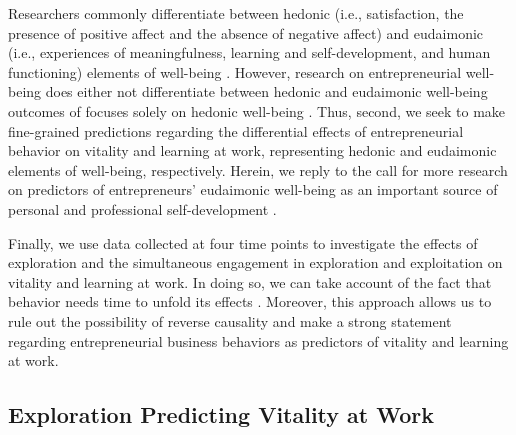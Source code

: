 \documentclass[man, 12pt, a4paper, noextraspace]{apa6}
\begin{document}
Researchers commonly differentiate between hedonic (i.e., satisfaction, the presence of positive affect and the absence of negative aﬀect) and eudaimonic (i.e., experiences of meaningfulness, learning and self-development, and human functioning) elements of well-being \parencite{Ryan.2001}. 
However, research on entrepreneurial well-being does either not differentiate between hedonic and eudaimonic well-being outcomes of focuses solely on hedonic well-being \parencite[see][]{Stephan2018, Ryff2019}. 
Thus, second, we seek to make fine-grained predictions regarding the differential effects of entrepreneurial behavior on vitality and learning at work, representing hedonic and eudaimonic elements of well-being, respectively. 
Herein, we reply to the call for more research on predictors of entrepreneurs' eudaimonic well-being as an important source of personal and professional self-development \parencite{Stephan2018, Ryff2019}. \par

Finally, we use data collected at four time points to investigate the effects of exploration and the simultaneous engagement in exploration and exploitation on vitality and learning at work.
In doing so, we can take account of the fact that behavior needs time to unfold its effects \parencite[e.g.][]{White2005}.
Moreover, this approach allows us to rule out the possibility of reverse causality and make a strong statement regarding entrepreneurial business behaviors as predictors of vitality and learning at work. 

\subsection{Exploration Predicting Vitality at Work}
\end{document}
